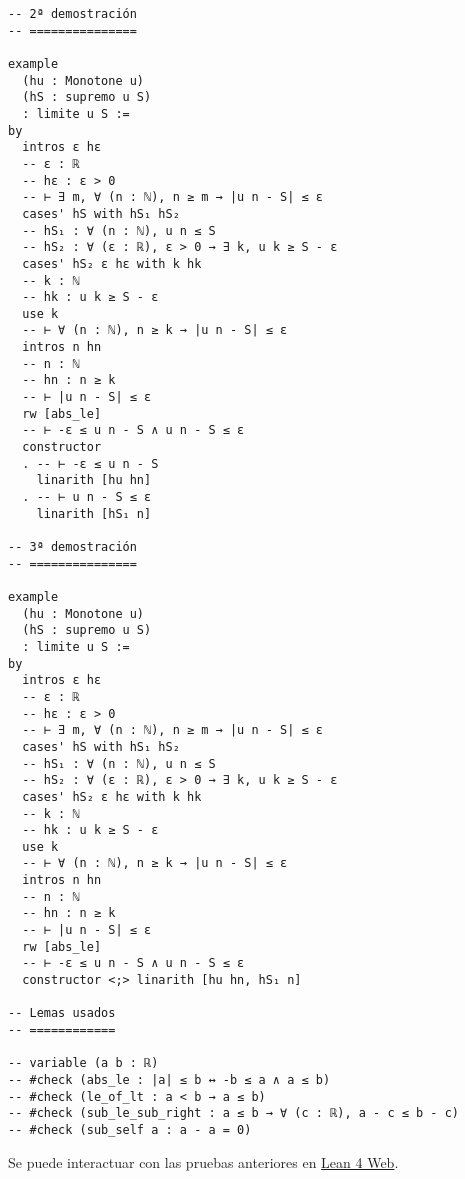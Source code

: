 \begin{verbatim}
-- 2ª demostración
-- ===============

example
  (hu : Monotone u)
  (hS : supremo u S)
  : limite u S :=
by
  intros ε hε
  -- ε : ℝ
  -- hε : ε > 0
  -- ⊢ ∃ m, ∀ (n : ℕ), n ≥ m → |u n - S| ≤ ε
  cases' hS with hS₁ hS₂
  -- hS₁ : ∀ (n : ℕ), u n ≤ S
  -- hS₂ : ∀ (ε : ℝ), ε > 0 → ∃ k, u k ≥ S - ε
  cases' hS₂ ε hε with k hk
  -- k : ℕ
  -- hk : u k ≥ S - ε
  use k
  -- ⊢ ∀ (n : ℕ), n ≥ k → |u n - S| ≤ ε
  intros n hn
  -- n : ℕ
  -- hn : n ≥ k
  -- ⊢ |u n - S| ≤ ε
  rw [abs_le]
  -- ⊢ -ε ≤ u n - S ∧ u n - S ≤ ε
  constructor
  . -- ⊢ -ε ≤ u n - S
    linarith [hu hn]
  . -- ⊢ u n - S ≤ ε
    linarith [hS₁ n]

-- 3ª demostración
-- ===============

example
  (hu : Monotone u)
  (hS : supremo u S)
  : limite u S :=
by
  intros ε hε
  -- ε : ℝ
  -- hε : ε > 0
  -- ⊢ ∃ m, ∀ (n : ℕ), n ≥ m → |u n - S| ≤ ε
  cases' hS with hS₁ hS₂
  -- hS₁ : ∀ (n : ℕ), u n ≤ S
  -- hS₂ : ∀ (ε : ℝ), ε > 0 → ∃ k, u k ≥ S - ε
  cases' hS₂ ε hε with k hk
  -- k : ℕ
  -- hk : u k ≥ S - ε
  use k
  -- ⊢ ∀ (n : ℕ), n ≥ k → |u n - S| ≤ ε
  intros n hn
  -- n : ℕ
  -- hn : n ≥ k
  -- ⊢ |u n - S| ≤ ε
  rw [abs_le]
  -- ⊢ -ε ≤ u n - S ∧ u n - S ≤ ε
  constructor <;> linarith [hu hn, hS₁ n]

-- Lemas usados
-- ============

-- variable (a b : ℝ)
-- #check (abs_le : |a| ≤ b ↔ -b ≤ a ∧ a ≤ b)
-- #check (le_of_lt : a < b → a ≤ b)
-- #check (sub_le_sub_right : a ≤ b → ∀ (c : ℝ), a - c ≤ b - c)
-- #check (sub_self a : a - a = 0)
\end{verbatim}
Se puede interactuar con las pruebas anteriores en \href{https://lean.math.hhu.de/\#url=https://raw.githubusercontent.com/jaalonso/Calculemus2/main/src/Los\_supremos\_de\_las\_sucesiones\_crecientes\_son\_sus\_limites.lean}{Lean 4 Web}.

